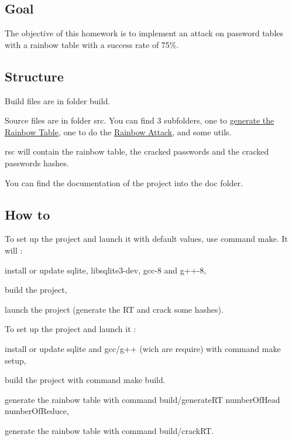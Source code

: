 \subsection*{Goal}

The objective of this homework is to implement an attack on password tables with a rainbow table with a success rate of 75\%.

\subsection*{Structure}

Build files are in folder {\ttfamily build}.

Source files are in folder {\ttfamily src}. You can find 3 subfolders, one to \hyperlink{namespacebe_1_1esi_1_1secl_1_1pn_af8b773cad93b0eb78b89f69721e4bb1d}{generate the Rainbow Table}, one to do the \hyperlink{namespacebe_1_1esi_1_1secl_1_1pn_aad832fb30fa4cc9e74d15d7129d0c929}{Rainbow Attack}, and some utils.

{\ttfamily rsc} will contain the rainbow table, the cracked passwords and the cracked passwords hashes.

You can find the documentation of the project into the {\ttfamily doc} folder.

\subsection*{How to}

To set up the project and launch it with default values, use command {\ttfamily make}. It will \+:
\begin{DoxyItemize}
\item install or update {\ttfamily sqlite}, {\ttfamily libsqlite3-\/dev}, {\ttfamily gcc-\/8} and {\ttfamily g++-\/8},
\item build the project,
\item launch the project (generate the RT and crack some hashes).
\end{DoxyItemize}

To set up the project and launch it \+:
\begin{DoxyItemize}
\item install or update sqlite and gcc/g++ (wich are require) with command {\ttfamily make setup},
\item build the project with command {\ttfamily make build}.
\item generate the rainbow table with command {\ttfamily build/generate\+RT number\+Of\+Head number\+Of\+Reduce},
\item generate the rainbow table with command {\ttfamily build/crack\+RT}.
\end{DoxyItemize}

